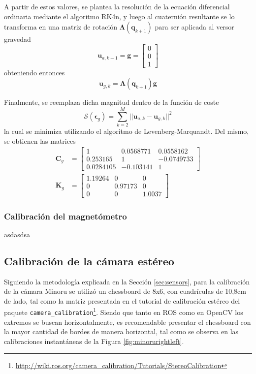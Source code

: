 A partir de estos valores, se plantea la resolución de la ecuación diferencial ordinaria mediante el algoritmo RK4n, y luego al cuaternión resultante se lo transforma en una matriz de rotación $\bm{\Lambda}(\bm{q}_{k+1})$ para ser aplicada al versor gravedad
\begin{equation}
    \bm{u}_{a,k-1} = \bm{g} =
    \begin{bmatrix}
        0 \\
        0 \\
        1
    \end{bmatrix}
\end{equation}
obteniendo entonces
\begin{equation}
    \bm{u}_{g,k} = \bm{\Lambda}(\bm{q}_{k+1})\bm{g}
\end{equation}

Finalmente, se reemplaza dicha magnitud dentro de la función de coste
\begin{equation}
    \mathscr{S}(\bm{\epsilon}_{g}) = \sum_{k=2}^M ||\bm{u}_{a,k} - \bm{u}_{g,k}||^2
\end{equation}
la cual se minimiza utilizando el algoritmo de Levenberg-Marquandt. Del mismo, se obtienen las matrices
\begin{align}
        \bm{C}_g &=
    \begin{bmatrix}
        1 & 0.0568771 & 0.0558162 \\
        0.253165 & 1 & -0.0749733 \\
        0.0284105 & -0.103141 & 1
    \end{bmatrix}
    \\
        \bm{K}_g &=
    \begin{bmatrix}
        1.19264 & 0 & 0 \\
        0 & 0.97173 & 0 \\
        0 & 0 & 1.0037
    \end{bmatrix}
\end{align}

\subsubsection{Calibración del magnetómetro}
asdasdsa

\subsection{Calibración de la cámara estéreo}
Siguiendo la metodología explicada en la Sección \ref{sec:sensors}, para la calibración de la cámara Minoru se utilizó un chessboard de 8x6, con cuadrículas de 10,8cm de lado, tal como la matriz presentada en el tutorial de calibración estéreo del paquete \texttt{camera\_calibration}\footnote{\url{http://wiki.ros.org/camera_calibration/Tutorials/StereoCalibration}}. Siendo que tanto en ROS como en OpenCV los extremos se buscan horizontalmente, es recomendable presentar el chessboard con la mayor cantidad de bordes de manera horizontal, tal como se observa en las calibraciones instantáneas de la Figura \ref{fig:minorurightleft}.

